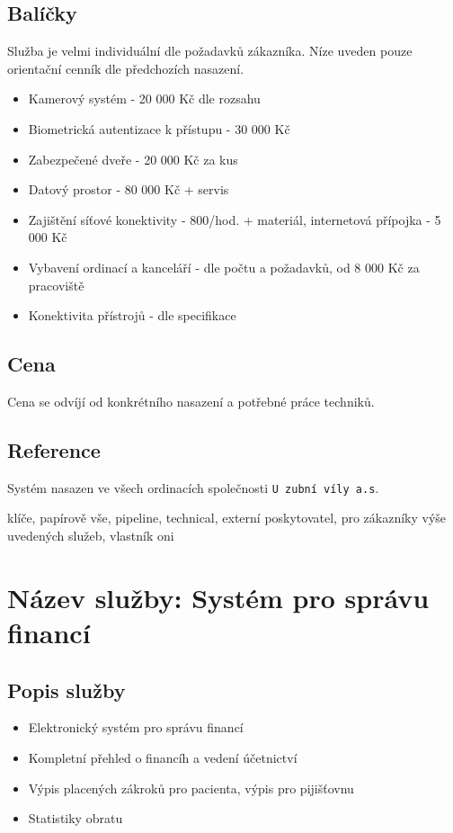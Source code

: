 \documentclass[12pt, a4paper, titlepage]{article}
\begin{document}
	\subsection*{Balíčky}
	Služba je velmi individuální dle požadavků zákazníka. Níze uveden pouze orientační cenník dle předchozích nasazení. 

	\begin{itemize}
		\item Kamerový systém - 20 000 Kč dle rozsahu
		\item Biometrická autentizace k přístupu - 30 000 Kč
		\item Zabezpečené dveře - 20 000 Kč za kus
		\item Datový prostor - 80 000 Kč + servis
		\item Zajištění síťové konektivity - 800/hod. + materiál, internetová přípojka - 5 000 Kč
		\item Vybavení ordinací a kanceláří - dle počtu a požadavků, od 8 000 Kč za pracoviště
		\item Konektivita přístrojů - dle specifikace
	\end{itemize}

	\subsection*{Cena}
	Cena se odvíjí od konkrétního nasazení a potřebné práce techniků.

	\subsection*{Reference}
	Systém nasazen ve všech ordinacích společnosti \texttt{U zubní víly a.s}.


	klíče, papírově vše, pipeline, technical, externí poskytovatel, pro zákazníky výše uvedených služeb,
	vlastník oni

	\newpage

	\noindent\makebox[\linewidth]{\rule{16cm}{0.4pt}}

	\section*{Název služby: Systém pro správu financí}

	\subsection*{Popis služby}
	\begin{itemize}
		\item Elektronický systém pro správu financí
		\item Kompletní přehled o financíh a vedení účetnictví
		\item Výpis placených zákroků pro pacienta, výpis pro pijišťovnu
		\item Statistiky obratu
	\end{itemize}
\end{document}
